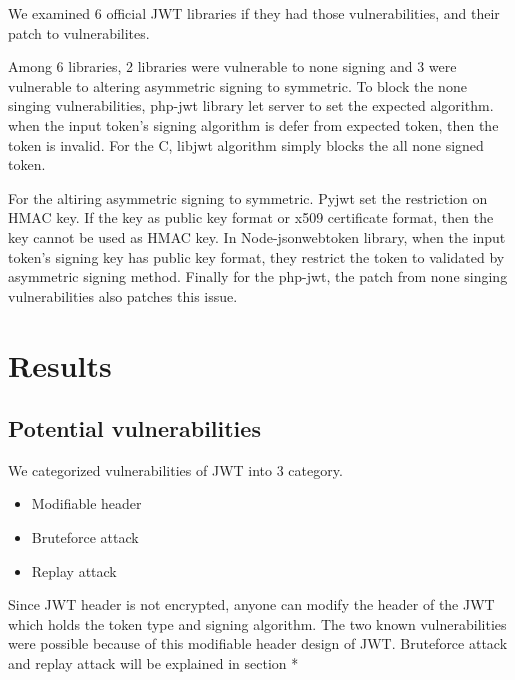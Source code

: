 \documentclass[journal,article,submit,moreauthors,pdftex,10pt,a4paper]{mdpi}
\begin{document}
We examined 6 official JWT libraries if they had those vulnerabilities, and their patch to vulnerabilites.

Among 6 libraries, 2 libraries were vulnerable to none signing and 3 were vulnerable to altering asymmetric signing to symmetric. To block the none singing vulnerabilities, php-jwt library let server to set the expected algorithm. when the input token's signing algorithm is defer from expected token, then the token is invalid. For the C, libjwt algorithm simply blocks the all none signed token.

For the altiring asymmetric signing to symmetric. Pyjwt set the restriction on HMAC key. If the key as public key format or x509 certificate format, then the key cannot be used as HMAC key. In Node-jsonwebtoken library, when the input token's signing key has public key format, they restrict the token to validated by asymmetric signing method. Finally for the php-jwt, the patch from none singing vulnerabilities also patches this issue.


\section{Results}
\subsection{Potential vulnerabilities}
We categorized vulnerabilities of JWT into 3 category.
\begin{itemize}[leftmargin=*,labelsep=4mm]
\item Modifiable header
\item Bruteforce attack
\item Replay attack
\end{itemize}

Since JWT header is not encrypted, anyone can modify the header of the JWT which holds the token type and signing algorithm. The two known vulnerabilities were possible because of this modifiable header design of JWT. Bruteforce attack and replay attack will be explained in section *
\end{document}
